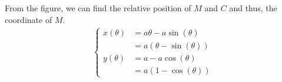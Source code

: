 \documentclass[a4paper]{report}
\begin{document}
%
%	
%	
%	
%	
%	
%	
%	
%
From the figure, we can find the relative position of $M$ and $C$ and thus, the coordinate of $M$.
\begin{align}
	\begin{cases}
	x(\theta) &= a\theta - a\sin(\theta)\\
	&= a\left(\theta - \sin(\theta)\right)\\
	y(\theta) &= a - a\cos(\theta)\\
	 &= a\left(1 - \cos(\theta)\right)
	\end{cases}
\end{align}
\end{document}
